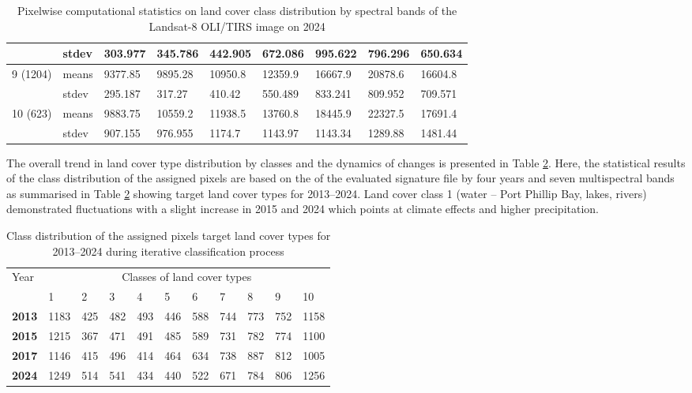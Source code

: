 \documentclass[jmse,article,submit,pdftex,moreauthors]{Definitions/mdpi}
\begin{document}
\begin{table}[H]
\begin{tabularx}{\linewidth}{p{1.3cm}p{1.0cm}p{1.0cm}p{1.0cm}p{1.0cm}p{1.0cm}p{1.0cm}p{1.0cm}p{1.0cm}}
    & stdev & 303.977 & 345.786 & 442.905 & 672.086 & 995.622 & 796.296 & 650.634 \\
    \midrule
    \multirow{2}{*}{9 (1204)} & means & 9377.85 & 9895.28 & 10950.8 & 12359.9 & 16667.9 & 20878.6 & 16604.8 \\
    & stdev & 295.187 & 317.27 & 410.42 & 550.489 & 833.241 & 809.952 & 709.571 \\
    \midrule
    \multirow{2}{*}{10 (623)} & means & 9883.75 & 10559.2 & 11938.5 & 13760.8 & 18445.9 & 22327.5 & 17691.4 \\
    & stdev & 907.155 & 976.955 & 1174.7 & 1143.97 & 1143.34 & 1289.88 & 1481.44 \\
    \midrule 
\bottomrule
\end{tabularx}
  \caption{Pixelwise computational statistics on land cover class distribution by spectral bands of the Landsat-8 OLI/TIRS image on 2024}
  \label{tab06}
\end{table}

The overall trend in land cover type distribution by classes and the dynamics of changes is presented in Table \ref{tab07}. Here, the statistical results of the class distribution of the assigned pixels are based on the of the evaluated signature file by four years and seven multispectral bands as summarised in Table \ref{tab07} showing target land cover types for 2013--2024. Land cover class 1 (water -- Port Phillip Bay, lakes, rivers) demonstrated fluctuations with a slight increase in 2015 and 2024 which points at climate effects and higher precipitation. 

\begin{table}[H]
  \centering
  \begin{tabularx}{\textwidth}{p{0.9cm}p{0.9cm}p{0.9cm}p{0.9cm}p{0.9cm}p{0.9cm}p{0.9cm}p{0.9cm}p{0.9cm}p{0.9cm}p{0.9cm}}
  \toprule
  \multirow{2}{*}{Year} & \multicolumn{10}{c}{Classes of land cover types} \\
     & 1 & 2 &  3 & 4 & 5 & 6 & 7 & 8 & 9 & 10 \\
    \midrule
    \textbf{2013} & 1183 & 425 & 482 & 493 & 446 & 588 & 744 & 773 & 752 & 1158 \\
    \textbf{2015} & 1215 & 367 & 471 & 491 & 485 & 589 & 731 & 782 & 774 & 1100 \\
    \textbf{2017} & 1146 & 415 & 496 & 414 & 464 & 634 & 738 & 887 & 812 & 1005 \\
    \textbf{2024} & 1249 & 514 & 541 & 434 & 440 & 522 & 671 & 784 & 806 & 1256 \\
\bottomrule
\end{tabularx}
  \caption{Class distribution of the assigned pixels target land cover types for 2013--2024 during iterative classification process}
  \label{tab07}
\end{table} 
\end{document}
